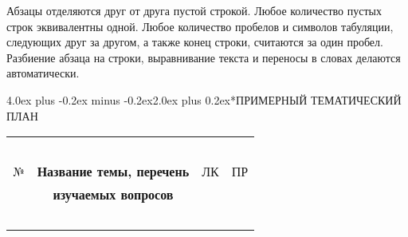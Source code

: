 \documentclass[12pt, a4paper]{book}%
\makeatletter
\renewcommand{\section}{\@startsection{section}{1}{1pt}%
{4.0ex plus -0.2ex minus -0.2ex}{2.0ex plus 0.2ex}{\centering\bf}}%
\makeatother
\begin{document}
{Абзацы отделяются друг от друга пустой строкой. Любое количество пустых строк
эквивалентны одной. Любое количество пробелов и символов табуляции, следующих
друг за другом, а также конец строки, считаются за один пробел.
Разбиение абзаца на строки, выравнивание текста и переносы
в словах делаются автоматически.


\newpage %

\section*{ПРИМЕРНЫЙ ТЕМАТИЧЕСКИЙ ПЛАН} %
{\normalsize%
\begin{center}%
\begin{longtable}{|c|p{12cm}|c|c|}%
\hline%
~ & ~ & ~ & ~  \\%
№ & \multicolumn{1}{|c|}{\bf Название  темы, перечень } & ЛК & ПР  \\%
~ & \multicolumn{1}{|c|}{\bf изучаемых вопросов}  & ~  &  ~ \\%
   ~ & ~ & ~ & ~  \\%
\hline%

\end{longtable}
\end{center}}}
\end{document}
